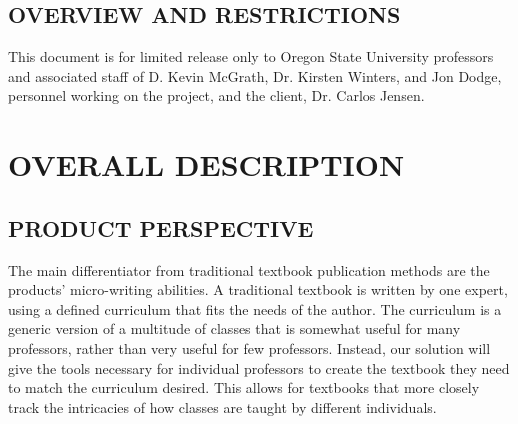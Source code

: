 \documentclass[letterpaper, 10pt, draftclsnofoot, compsoc, onecolumn]{IEEEtran}
\begin{document}
\subsection[OVERVIEW AND RESTRICTIONS]{\rmfamily\bfseries\color{black} OVERVIEW AND RESTRICTIONS}


{\noindent
This document is for limited release only to Oregon State University professors and
associated staff of D. Kevin McGrath, Dr. Kirsten Winters, and Jon Dodge, personnel
working on the project, and the client, Dr. Carlos Jensen.}


\bigskip



\bigskip



\bigskip




\bigskip


\clearpage
\section[OVERALL DESCRIPTION]{\rmfamily\bfseries\color{black} OVERALL DESCRIPTION}

\subsection[PRODUCT PERSPECTIVE]{\rmfamily\bfseries\color{black} PRODUCT PERSPECTIVE}

{\noindent
The main differentiator from traditional textbook publication methods are the products'
micro-writing abilities. A traditional textbook is written by one expert, using a defined
curriculum that fits the needs of the author. The curriculum is a generic version of a
multitude of classes that is somewhat useful for many professors, rather than very useful
for few professors. Instead, our solution will give the tools necessary for individual 
professors to create the textbook they need to match the curriculum desired. This allows 
for textbooks that more closely track the intricacies of how classes are taught by 
different individuals.}
\end{document}
